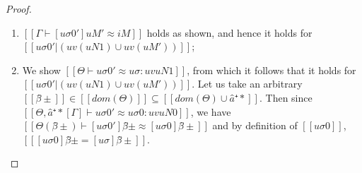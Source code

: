 \begin{proof}
\begin{caseof}
\begin{enumerate}
\begin{enumerate}
                        \item $[[Γ ⊢ [uσ0']uM' ≈ iM]]$ holds as shown,
                            and hence it holds for $[[uσ0'|(uv(uN1) ∪ uv(uM'))]]$;
                        \item We show $[[Θ ⊢ uσ0' ≈ uσ : uv uN1]]$, from which
                            it follows that it holds for $[[uσ0'|(uv(uN1) ∪ uv(uM'))]]$.
                            Let us take an arbitrary 
                            $[[β̂±]] \in [[dom(Θ)]] \subseteq [[dom(Θ) ∪ {â⁺*}]]$. Then 
                            since $[[Θ, â⁺*[Γ] ⊢ uσ0' ≈ uσ0 : uv uN0]]$, 
                            we have $[[Θ(β̂±) ⊢ [uσ0']β̂±  ≈ [uσ0]β̂± ]]$ and 
                            by definition of $[[uσ0]]$, $[[ [uσ0]β̂±  = [uσ]β̂± ]]$.
                    \end{enumerate}
            \end{enumerate}
           

\end{caseof}
\end{proof}
